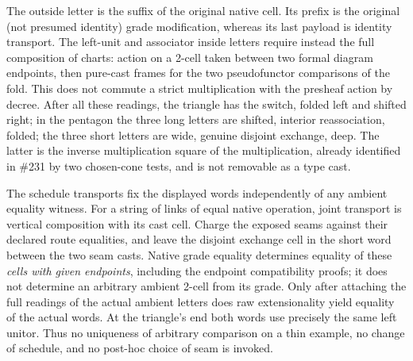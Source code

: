 \documentclass[11pt]{article}
\begin{document}
The outside letter is the suffix of the original native cell. Its prefix is the original (not presumed identity) grade modification, whereas its last payload is identity transport. The left-unit and associator inside letters require instead the full composition of charts: action on a 2-cell taken between two formal diagram endpoints, then pure-cast frames for the two pseudofunctor comparisons of the fold. This does not commute a strict multiplication with the presheaf action by decree. After all these readings, the triangle has the switch, folded left and shifted right; in the pentagon the three long letters are shifted, interior reassociation, folded; the three short letters are wide, genuine disjoint exchange, deep. The latter is the inverse multiplication square of the multiplication, already identified in \#231 by two chosen-cone tests, and is not removable as a type cast.

The schedule transports fix the displayed words independently of any ambient equality witness. For a string of links of equal native operation, joint transport is vertical composition with its cast cell. Charge the exposed seams against their declared route equalities, and leave the disjoint exchange cell in the short word between the two seam casts. Native grade equality determines equality of these \emph{cells with given endpoints}, including the endpoint compatibility proofs; it does not determine an arbitrary ambient 2-cell from its grade. Only after attaching the full readings of the actual ambient letters does raw extensionality yield equality of the actual words. At the triangle's end both words use precisely the same left unitor. Thus no uniqueness of arbitrary comparison on a thin example, no change of schedule, and no post-hoc choice of seam is invoked.
\end{document}
